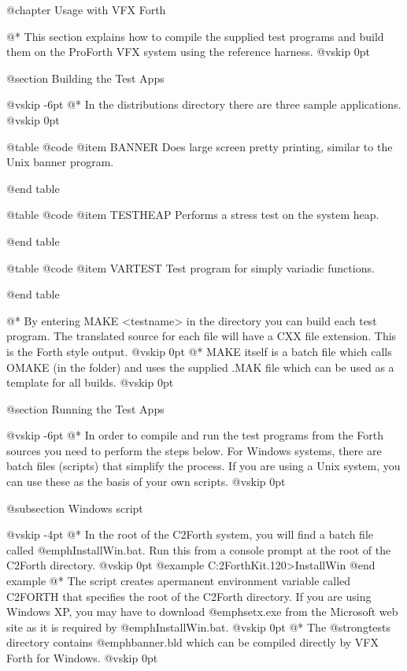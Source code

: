 
@chapter Usage with VFX Forth

@*
This section explains how to compile the supplied test programs
and build them on the ProForth VFX system using the reference
harness.
@vskip 0pt

@section Building the Test Apps


@vskip -6pt
@*
In the distributions \TESTS directory there are three sample
applications.
@vskip 0pt


@table @code
@item BANNER
Does large screen pretty printing, similar to the Unix
 banner program.

@end table



@table @code
@item TESTHEAP
Performs a stress test on the system heap.

@end table



@table @code
@item VARTEST
Test program for simply variadic functions.

@end table

@*
By entering MAKE <testname> in the \TESTS directory you can build
each test program. The translated source for each file will have
a CXX file extension. This is the Forth style output.
@vskip 0pt
@*
MAKE itself is a batch file which calls OMAKE (in the \BIN folder)
and uses the supplied .MAK file which can be used as a template
for all builds.
@vskip 0pt

@section Running the Test Apps


@vskip -6pt
@*
In order to compile and run the test programs from the Forth
sources you need to perform the steps below. For Windows
systems, there are batch files (scripts) that simplify the
process. If you are using a Unix system, you can use these
as the basis of your own scripts.
@vskip 0pt

@subsection Windows script


@vskip -4pt
@*
In the root of the C2Forth system, you will find a batch
file called @emph{InstallWin.bat}. Run this from a console
prompt at the root of the C2Forth directory.
@vskip 0pt
@example
C:\Products\C2ForthKit.120>InstallWin @end example
@*
The script creates apermanent environment variable called
C2FORTH that specifies the root of the C2Forth directory.
If you are using Windows XP, you may have to download
@emph{setx.exe} from the Microsoft web site as it is required
by @emph{InstallWin.bat}.
@vskip 0pt
@*
The @strong{tests} directory contains @emph{banner.bld} which
can be compiled directly by VFX Forth for Windows.
@vskip 0pt

